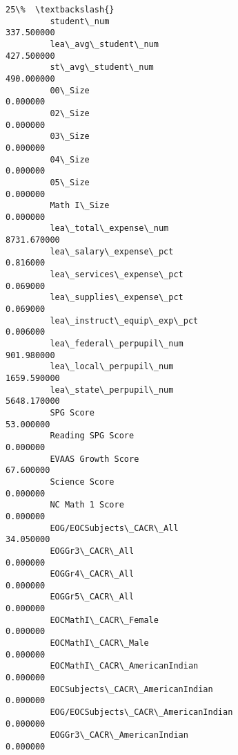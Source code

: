 \documentclass[11pt]{article}
\begin{document}
\begin{Verbatim}[commandchars=\\\{\}]
                                                                       25\%  \textbackslash{}
         student\_num                                            337.500000   
         lea\_avg\_student\_num                                    427.500000   
         st\_avg\_student\_num                                     490.000000   
         00\_Size                                                  0.000000   
         02\_Size                                                  0.000000   
         03\_Size                                                  0.000000   
         04\_Size                                                  0.000000   
         05\_Size                                                  0.000000   
         Math I\_Size                                              0.000000   
         lea\_total\_expense\_num                                 8731.670000   
         lea\_salary\_expense\_pct                                   0.816000   
         lea\_services\_expense\_pct                                 0.069000   
         lea\_supplies\_expense\_pct                                 0.069000   
         lea\_instruct\_equip\_exp\_pct                               0.006000   
         lea\_federal\_perpupil\_num                               901.980000   
         lea\_local\_perpupil\_num                                1659.590000   
         lea\_state\_perpupil\_num                                5648.170000   
         SPG Score                                               53.000000   
         Reading SPG Score                                        0.000000   
         EVAAS Growth Score                                      67.600000   
         Science Score                                            0.000000   
         NC Math 1 Score                                          0.000000   
         EOG/EOCSubjects\_CACR\_All                                34.050000   
         EOGGr3\_CACR\_All                                          0.000000   
         EOGGr4\_CACR\_All                                          0.000000   
         EOGGr5\_CACR\_All                                          0.000000   
         EOCMathI\_CACR\_Female                                     0.000000   
         EOCMathI\_CACR\_Male                                       0.000000   
         EOCMathI\_CACR\_AmericanIndian                             0.000000   
         EOCSubjects\_CACR\_AmericanIndian                          0.000000   
         EOG/EOCSubjects\_CACR\_AmericanIndian                      0.000000   
         EOGGr3\_CACR\_AmericanIndian                               0.000000   

\end{Verbatim}
\end{document}
